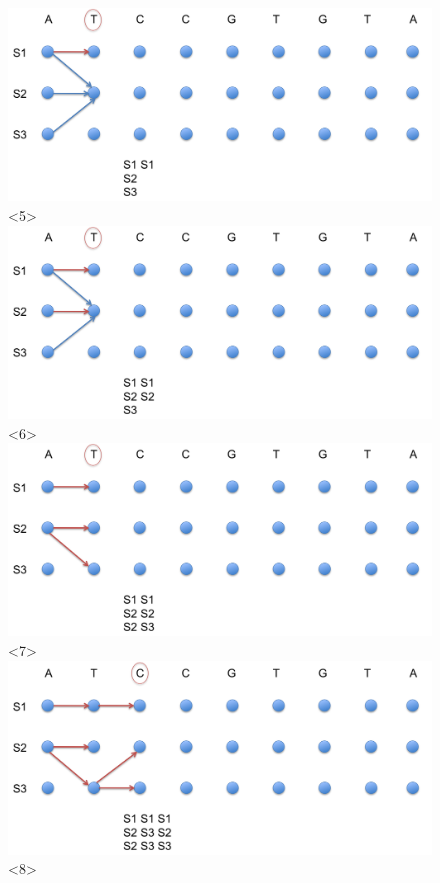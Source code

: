 \documentclass{beamer}
\begin{document}
\begin{frame}
\begin{figure}[h]
			\includegraphics[width=1.0\textwidth]{../picturesforthepresentation/Viterbi5.png}<5>
			\includegraphics[width=1.0\textwidth]{../picturesforthepresentation/Viterbi6.png}<6>
			\includegraphics[width=1.0\textwidth]{../picturesforthepresentation/Viterbi7.png}<7>
			\includegraphics[width=1.0\textwidth]{../picturesforthepresentation/Viterbi8.png}<8>

\end{figure}
\end{frame}
\end{document}

